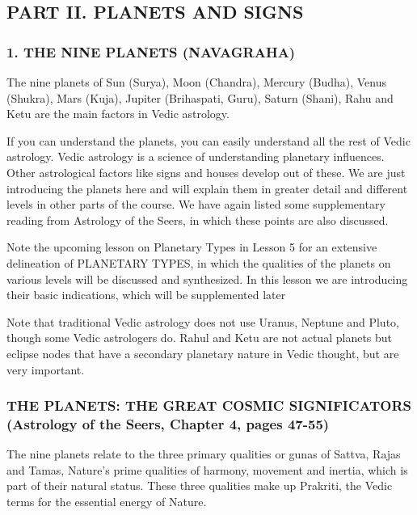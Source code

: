 \subsection{PART II. PLANETS AND SIGNS}
 

\subsubsection{1. THE NINE PLANETS (NAVAGRAHA)}
 

The nine planets of Sun (Surya), Moon (Chandra), Mercury (Budha), Venus (Shukra), Mars (Kuja), Jupiter (Brihaspati, Guru), Saturn (Shani), Rahu and Ketu are the main factors in Vedic astrology.

 

If you can understand the planets, you can easily understand all the rest of Vedic astrology. Vedic astrology is a science of understanding planetary influences. Other astrological factors like signs and houses develop out of these. We are just introducing the planets here and will explain them in greater detail and different levels in other parts of the course. We have again listed some supplementary reading from Astrology of the Seers, in which these points are also discussed.

Note the upcoming lesson on Planetary Types in Lesson 5 for an extensive delineation of  PLANETARY TYPES, in which the qualities of the planets on various levels will be discussed and synthesized. In this lesson we are introducing their basic indications, which will be supplemented later

Note that traditional Vedic astrology does not use Uranus, Neptune and Pluto, though some Vedic astrologers do. Rahul and Ketu are not actual planets but eclipse nodes that have a secondary planetary nature in Vedic thought, but are very important.

 

\subsubsection{THE PLANETS: THE GREAT COSMIC SIGNIFICATORS (Astrology of the Seers, Chapter 4, pages 47-55)}


 

The nine planets relate to the three primary qualities or gunas of Sattva, Rajas and Tamas, Nature’s prime qualities of harmony, movement and inertia, which is  part of their natural status. These three qualities make up Prakriti, the Vedic terms for the essential energy of Nature.

